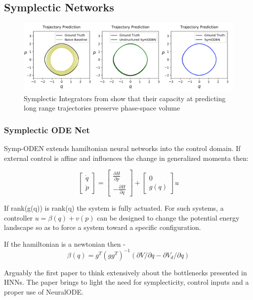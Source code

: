 \documentclass{article}
\begin{document}
\subsection{Symplectic Networks}

\begin{figure}
\centering
\includegraphics[width=\textwidth]{figures/4sympnet.png}
\caption{Symplectic Integrators from \cite{zhong_symplectic_2019} show that their capacity at predicting long range trajectories preserve phase-space volume}
\end{figure}

\subsubsection{Symplectic ODE Net}

Symp-ODEN \cite{zhong_symplectic_2019} extends hamiltonian neural networks into the control domain. If external control is affine and influences the change in generalized momenta then:

$$ 
\begin{bmatrix}
\dot{q} \\
\dot{p}
\end{bmatrix}
= 
\begin{bmatrix}
\frac{\partial H}{\partial p} \\
-\frac{\partial H}{\partial q}
\end{bmatrix}
+
\begin{bmatrix}
0 \\
g(q)
\end{bmatrix} u
$$

If rank(g(q)) is rank(q) the system is fully actuated. For such systems, a controller $u = \beta(q) +v(p) $ can be designed to change the potential energy landscape so as to force a system toward a specific configuration.

If the hamiltonian is a newtonian then - $$ \beta(q) = g^T (gg^T)^{-1} (\partial V/\partial q - \partial V_d/\partial q) $$

Arguably the first paper to think extensively about the bottlenecks presented in HNNs. The paper brings to light the need for symplecticity, control inputs and a proper use of NeuralODE. 
\end{document}

